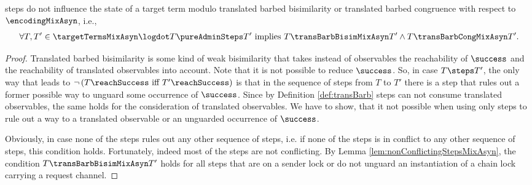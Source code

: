 \documentclass[]{llncs}
\begin{document}
\begin{lemma} \label{lem:pureAdminStepsTransBarbBisimMixAsyn}
	\Pure \admin steps do not influence the state of a target term modulo translated barbed bisimilarity or translated barbed congruence with respect to $ \encodingMixAsyn $, i.e.,
	\begin{align*}
		\forall T, T' \in \targetTermsMixAsyn \logdot T \pureAdminSteps T' \text{ implies } T \transBarbBisimMixAsyn T' \wedge T \transBarbCongMixAsyn T'.
	\end{align*}
\end{lemma}

\begin{proof}
	Translated barbed bisimilarity is some kind of weak bisimilarity that takes instead of observables the reachability of $ \success $ and the reachability of translated observables into account. Note that it is not possible to reduce $ \success $. So, in case $ T \steps T' $, the only way that leads to $ \neg\left( T\reachSuccess \text{ iff } T'\reachSuccess \right) $ is that in the sequence of steps from $ T $ to $ T' $ there is a step that rules out a former possible way to unguard some occurrence of $ \success $. Since by Definition \ref{def:transBarb} \pure \admin steps can not consume translated observables, the same holds for the consideration of translated observables. We have to show, that it not possible when using only \pure \admin steps to rule out a way to a translated observable or an unguarded occurrence of $ \success $.
	
	Obviously, in case none of the \pure \admin steps rules out any other sequence of steps, i.e. if none of the \pure \admin steps is in conflict to any other sequence of steps, this condition holds. Fortunately, indeed most of the \pure \admin steps are not conflicting. By Lemma \ref{lem:nonConflictingStepsMixAsyn}, the condition $ T \transBarbBisimMixAsyn T' $ holds for all steps that are on a sender lock or do not unguard an instantiation of a chain lock carrying a request channel.
	

\end{proof}
\end{document}
